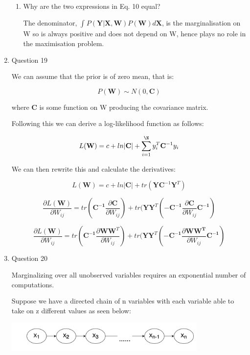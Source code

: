 \documentclass[13pt]{article}
\begin{document}
\begin{enumerate}
\begin{enumerate}
      \item{\Large Why are the two expressions in Eq. 10 equal?}
      
      The denominator, $\int_{}^{} P(\mathbf{Y}| \mathbf{X}, \mathbf{W})P(\mathbf{W})  d\mathbf{X}$, is the marginalisation on W so is always positive and does not depend on W, hence plays no role in the maximisation problem.
  \end{enumerate}
  
  \item{\large Question 19}
  
  We can assume that the prior is of zero mean, that is:
  
  $$P(\mathbf{W}) \sim N(0, \mathbf{C})$$
  
  where $\mathbf{C}$ is some function on W producing the covariance matrix.
  
  Following this we can derive a log-likelihood function as follows:
  
  $$L(\mathbf{W}) = c + ln |\mathbf{C}| +  \sum_{i=1}^{\N} y_i^T\mathbf{C}^{-1}y_i $$
  
  We can then rewrite this and calculate the derivatives:
  
  $$L(\mathbf{W}) = c + ln |\mathbf{C}| +  tr(\mathbf{Y}\mathbf{C}^{-1}\mathbf{Y}^T)$$
  
  $$\frac{\partial L(\mathbf{W})}{\partial W_{ij}} = tr(\mathbf{C^{-1}}\frac{\partial \mathbf{C}}{\partial W_{ij}}) + tr(\mathbf{Y}\mathbf{Y}^T(-\mathbf{C^{-1}} \frac{ \partial \mathbf{C}}{\partial W_{ij}} \mathbf{C^{-1}})$$
  
  
  $$\frac{\partial L(\mathbf{W})}{\partial W_{ij}} = tr(\mathbf{C^{-1}}\frac{\partial \mathbf{W}\mathbf{W}^T}{\partial W_{ij}}) + tr(\mathbf{Y}\mathbf{Y}^T(-\mathbf{C^{-1}} \frac{ \partial \mathbf{\mathbf{W}\mathbf{W}^T}}{\partial W_{ij}} \mathbf{C^{-1}})$$
  
  
  
  \item{\large Question 20}
  
  Marginalizing over all unobserved variables requires an exponential number of computations.
  
  Suppose we have a directed chain of n variables with each variable able to take on z different values as seen below:
  
  \includegraphics[width=100mm,scale=0.5]{images/q20.png}
  

\end{enumerate}
\end{document}
